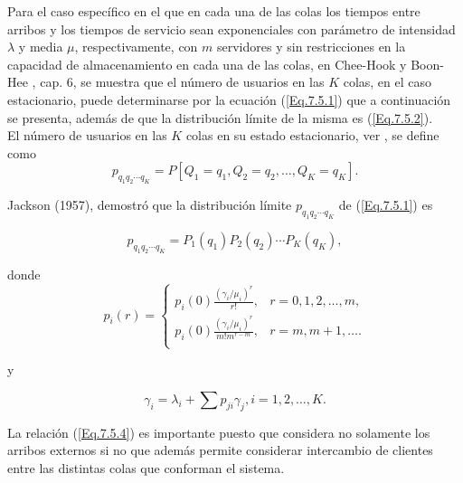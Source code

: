 \documentclass{article}
\numberwithin{equation}{section}
\begin{document}
{Para el caso espec\'ifico en el que en cada una de las colas los tiempos entre arribos y los tiempos de servicio sean exponenciales con par\'ametro de intensidad $\lambda$ y media $\mu$, respectivamente, con $m$ servidores y sin restricciones en la capacidad de almacenamiento en cada una de las colas, en Chee-Hook y Boon-Hee \cite{HookHee}, cap. 6, se muestra que el n\'umero de
usuarios en las $K$ colas, en el caso estacionario, puede determinarse por la ecuaci\'on (\ref{Eq.7.5.1})  que a
continuaci\'on se presenta, adem\'as de que la distribuci\'on l\'imite de la misma es (\ref{Eq.7.5.2}).\\

El n\'umero de usuarios en las $K$ colas en su estado estacionario, ver \cite{Bhat}, se define como
\begin{equation}\label{Eq.7.5.1}
p_{q_{1}q_{2}\cdots
q_{K}}=P\left[Q_{1}=q_{1},Q_{2}=q_{2},\ldots,Q_{K}=q_{K}\right].
\end{equation}

Jackson (1957), demostr\'o que la distribuci\'on l\'imite
$p_{q_{1}q_{2}\cdots q_{K}}$ de (\ref{Eq.7.5.1}) es

\begin{equation}\label{Eq.7.5.2}
p_{q_{1}q_{2}\cdots
q_{K}}=P_{1}\left(q_{1}\right)P_{2}\left(q_{2}\right)\cdots
P_{K}\left(q_{K}\right),
\end{equation}

donde
\begin{equation}\label{Eq.7.5.3}
p_{i}\left(r\right)=\left\{\begin{array}{cc}
 p_{i}\left(0\right)\frac{\left(\gamma_{i}/\mu_{i}\right)^{r}}{r!},  & r=0,1,2,\ldots,m, \\
 p_{i}\left(0\right)\frac{\left(\gamma_{i}/\mu_{i}\right)^{r}}{m!m^{r-m}}, & r=m,m+1,\ldots .\\
\end{array}\right.
\end{equation}

y

\begin{equation}\label{Eq.7.5.4}
\gamma_{i}=\lambda_{i}+\sum p_{ji}\gamma_{j},\textrm{
}i=1,2,\ldots,K.
\end{equation}

La relaci\'on (\ref{Eq.7.5.4}) es importante puesto que considera no solamente los arribos externos si no que adem\'as permite considerar intercambio de clientes entre las distintas colas que conforman el sistema.\\

}
\end{document}
